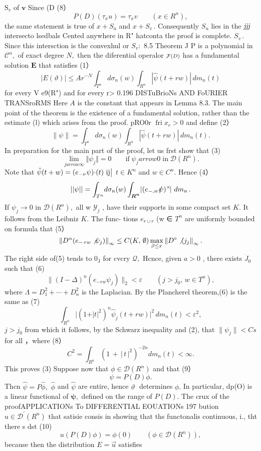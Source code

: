 $\mathrm{S}_{v}$ of $\boldsymbol{v}$ Since (D (8） $$ P(D)(\tau_{x}u)=\tau_{x}v\qquad(x\in R^{n}), $$ the same statement is true of $x+S_{u}$ and $x+S_{v}\,.$ Consequently $S_{u}$ lies in the ${\it j}{\it j}{\it j}$ intersecto lsedbals Cented anywhere in R" hatconta the proof is complete. $S_{v}\,.$ Since this intersction is the convexhul or $S_{v}:$ 8.5 Theorem J P is a polynomial in ${\mathcal{C}}^{n},$ of exact degree $N,$ then the diferential operalor $\scriptstyle{\cal{F}}(D)$ has a fundamental solution $\boldsymbol{E}$ that satisfies (1） $$ \left|E(\vartheta)\right|\leq A r^{-N}\int_{T^{n}}\!\!d\sigma_{n}(w)\int_{R^{n}}\!\left|\hat{\psi}(t+r w)\right|\,d m_{n}(t) $$ for every V e9(R") and for every r> 0.196 DISTuBrioNs AND FoURIER TRANSroRMS Here $\textstyle A$ is the constant that appears in Lemma 8.3. The main point of the theorem is the existence of a fundamental solution, rather than the estimate (l) which arises from the proof. pRO0r $\operatorname{fri}x_{r}>0$ and define (2） $$ \left\|\psi\right\|=\int_{T^{n}}\!d\sigma_{n}(w)\int_{R^{n}}\left|\hat{\psi}(t+r w)\right|\,d m_{n}(t). $$ In preparation for the main part of the proof, let us frst show that (3) $$ \operatorname*{lim}_{j arrow\infty}\Vert\psi_{j}\Vert=0\qquad\mathrm{if}\;\psi_{j} arrow0\;\mathrm{in}\;\mathcal{D}(R^{n}). $$ Note that $\hat{\psi}(t+w)=(e_{-\nu}\psi){\bf\cdot}(t)\ \mathrm{i}\mathrm{j}\big|$ $\scriptstyle t\in K^{n}$ and $w\in C^{n}.$ Hence (4） $$ ||\psi||=\int_{T^{n}}\!d\sigma_{n}(w)\int_{\boldsymbol{R^{n}}}\!|(e_{-,w}{\rlap/\psi})^{\times}\!|\ d m_{n}\,. $$ If $\psi_{j}\to0$ in ${\mathcal{D}}(R^{n}),$ all w ${\mathcal{Y}}_{j}$ , have their supports in some compact set $K.$ It follows from the Leibniz $K.$ The func- tions $e_{r\cup r}$ (w ∈ $T^{n}$ are uniformly bounded on formula that (5） $$ \left\|D^{\alpha}(e_{-\,r w}\not\psi_{j})\right\|_{\infty}\leq C(K,\,\emptyset)\mathop{\mathrm{max}}_{\beta\leq x}\left\|D^{\circ}\not\langle j_{j}\right\|_{\infty}. $$ The right side of(5) tends to $0_{\mathrm{{J}}}$ for cvcry ${\mathcal{Q}},$ Hcnce, given $\scriptstyle a>0$ , there exists ${\dot{J}}_{0}$ such that (6) $$ \|(I-\Delta)^{n}(e_{-r w}\psi_{j})\|_{2}<\varepsilon\qquad(j>j_{0},\,w\in T^{n}), $$ where $\Lambda=D_{1}^{2}+\cdots+D_{n}^{2}$ is the Laplacian. By the Plancherel theorem,(6) is the same as (7) $$ \int_{R^{n}} |(1+\vert t\vert^{2})^{n}{\hat{\psi}}_{j}(t+r w)\vert^{2}\,d m_{n}(t)<\varepsilon^{2}, $$ $j>j_{0}$ from which it follows, by the Schwarz inequality and (2), that $\|\psi_{j}\|<C s$ for all ，where (8） $$ C^{2}=\int_{R^{n}}\left(1\,+\,\left|\,t\,\right|^{2}\right)^{-2n}d m_{n}(t)<\infty. $$ This proves (3) Suppose now that $\phi\in{\mathcal{D}}(R^{n})$ and that (9） $$ \psi=P(D)\phi. $$ Thcn ${\hat{\psi}}=P{\hat{\phi}},$ $\hat{\phi}$ and $\hat{\mathcal{\psi}}$ are entire, hence $\vartheta\;$ determines $\phi.$ In particular, dp(O) is a linear functional of ${\boldsymbol{\psi}},$ defined on the range of $P(D).$ The crux of the proofAPPLICATIONs To DIFFERENTIAL EOUATIONs 197 bution $u\in{\mathcal{D}}^{\prime}(R^{n})$ that satisie consis in showing that ths functonalis continuous, i., tht there s dst (10) $$ u(P(D)\phi)=\phi(0)\qquad(\phi\in{\mathcal D}(R^{n})), $$ because then the distribution $E={\vec{u}}$ satisfies 